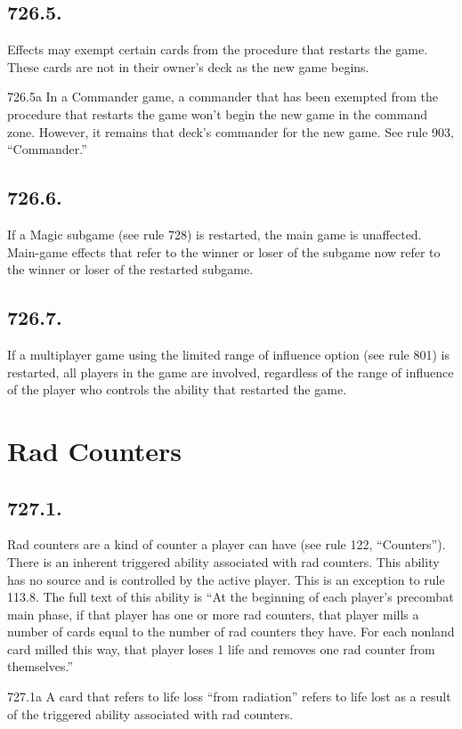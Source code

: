 \subsection*{726.5.}
Effects may exempt certain cards from the procedure that restarts the game. These cards are not in their owner’s deck as the new game begins.

726.5a In a Commander game, a commander that has been exempted from the procedure that restarts the game won’t begin the new game in the command zone. However, it remains that deck’s commander for the new game. See rule 903, “Commander.”

\subsection*{726.6.}
If a Magic subgame (see rule 728) is restarted, the main game is unaffected. Main-game effects that refer to the winner or loser of the subgame now refer to the winner or loser of the restarted subgame.

\subsection*{726.7.}
If a multiplayer game using the limited range of influence option (see rule 801) is restarted, all players in the game are involved, regardless of the range of influence of the player who controls the ability that restarted the game.

\section{Rad Counters}
\subsection*{727.1.}
Rad counters are a kind of counter a player can have (see rule 122, “Counters”). There is an inherent triggered ability associated with rad counters. This ability has no source and is controlled by the active player. This is an exception to rule 113.8. The full text of this ability is “At the beginning of each player’s precombat main phase, if that player has one or more rad counters, that player mills a number of cards equal to the number of rad counters they have. For each nonland card milled this way, that player loses 1 life and removes one rad counter from themselves.”

727.1a A card that refers to life loss “from radiation” refers to life lost as a result of the triggered ability associated with rad counters.


